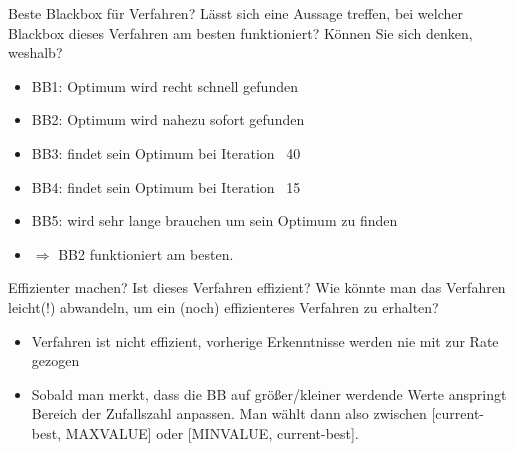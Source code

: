 \documentclass{ocbeameruni}
\begin{document}
\begin{frame}{Beste Blackbox für Verfahren?}
Lässt sich eine Aussage treffen, bei welcher Blackbox dieses Verfahren am besten funktioniert?
Können Sie sich denken, weshalb?
    \begin{itemize}
    \item BB1: Optimum wird recht schnell gefunden
    \item BB2: Optimum wird nahezu sofort gefunden
    \item BB3: findet sein Optimum bei Iteration ~40
    \item BB4: findet sein Optimum bei Iteration ~15
    \item BB5: wird sehr lange brauchen um sein Optimum zu finden
    \item $\Rightarrow$ BB2 funktioniert am besten.
    \end{itemize}
\end{frame}


\begin{frame}{Effizienter machen?}
Ist dieses Verfahren effizient? Wie könnte man das Verfahren leicht(!) abwandeln, um ein (noch)
effizienteres Verfahren zu erhalten?
    \begin{itemize}
    \item Verfahren ist nicht effizient, vorherige Erkenntnisse werden nie mit zur Rate gezogen
    \item Sobald man merkt, dass die BB auf größer/kleiner werdende Werte anspringt Bereich der Zufallszahl anpassen. Man wählt dann also zwischen [current-best, MAXVALUE] oder [MINVALUE, current-best]. 
    \end{itemize}
\end{frame}
\end{document}
